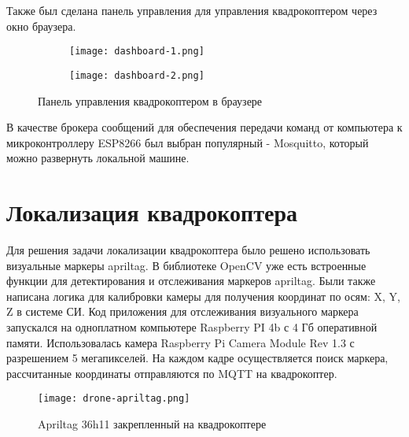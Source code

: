 Также был сделана панель управления для управления квадрокоптером через окно
браузера. 


\begin{figure}[ht]
	\centering
\hspace*{\fill}%
	\begin{subfigure}[b]{0.49\textwidth}
        \centering
		\texttt{[image: dashboard-1.png]}
		\caption{}
		\label{fig:tiger1}
	\end{subfigure}
\hfill
	\begin{subfigure}[b]{0.49\textwidth}
        \centering
		\texttt{[image: dashboard-2.png]}
        \caption{}
		\label{fig:tiger2}
	\end{subfigure}
\hspace*{\fill}%
	\caption{Панель управления квадрокоптером в браузере}
	\label{fig:tiger}
\end{figure}

В качестве брокера сообщений для обеспечения передачи команд от компьютера к 
микроконтроллеру ESP8266 был выбран популярный - Mosquitto, который можно развернуть 
локальной машине\cite{Mosquitto}.

\newpage

\section{Локализация квадрокоптера}

Для решения задачи локализации квадрокоптера было решено использовать визуальные маркеры apriltag\cite{AprilTag}.
В библиотеке OpenCV уже есть встроенные функции для детектирования и отслеживания маркеров apriltag\cite{OpenCV}\cite{Aruco}.
Были также написана логика для калибровки камеры для получения координат 
 по осям: X, Y, Z в системе СИ. Код приложения для отслеживания визуального маркера 
запускался на одноплатном компьютере Raspberry PI 4b с 4 Гб оперативной памяти. 
Использовалась камера Raspberry Pi Camera Module Rev 1.3 с разрешением 5 мегапикселей.
На каждом кадре осуществляется поиск маркера, рассчитанные координаты отправляются по
MQTT на квадрокоптер.


\begin{figure}[ht]
    \centering
    \texttt{[image: drone-apriltag.png]}
    \caption{Apriltag 36h11 закрепленный на квадрокоптере}
    \label{}
\end{figure}


